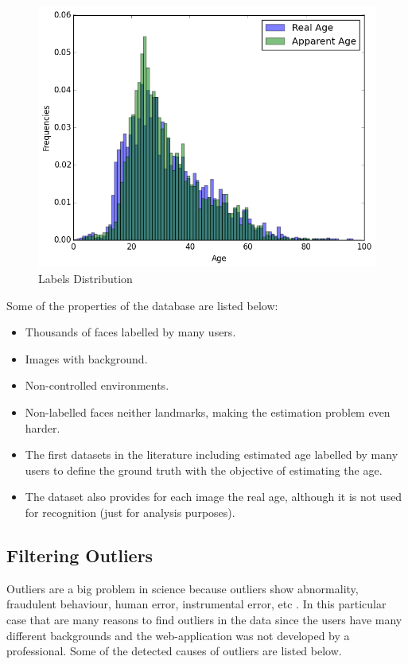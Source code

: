 \begin{figure}[h!]
	\centering
	\includegraphics[width=\textwidth]{figures/Label_Distribution}
	\caption{Labels Distribution}
	\label{fig:distr}
\end{figure}

Some of the properties of the database are listed below:

\begin{itemize}
	\item Thousands of faces labelled by many users.
	\item Images with background.
	\item Non-controlled environments.
	\item Non-labelled faces neither landmarks, making the estimation problem even harder.
	\item The first datasets in the literature including
	estimated age labelled by many users to define the ground truth with the objective of estimating the age.
	\item The dataset also provides for each image the real age, although it is not used for recognition (just for analysis purposes).
\end{itemize}

\subsection{Filtering Outliers}

Outliers are a big problem in science because outliers show abnormality, fraudulent behaviour, human error, instrumental error, etc \cite{Hodge:2004:SOD:1028911.1028946}. In this particular case that are many reasons to find outliers in the data since the users have many different backgrounds and the web-application was not developed by a professional. Some of the detected causes of outliers are listed below.

